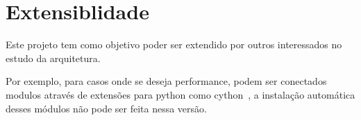 \section{Extensiblidade}

	Este projeto tem como objetivo poder ser extendido por outros interessados no estudo da arquitetura. 

	Por exemplo, para casos onde se deseja performance, podem ser conectados modulos através de extensões para python como cython~\cite{cython_home}, a instalação automática desses módulos não pode ser feita nessa versão.
